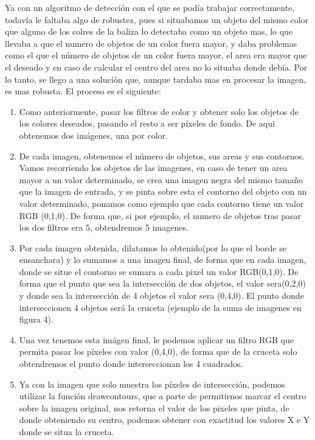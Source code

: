 \hspace{1cm} Ya con un algoritmo de detecci\'on con el que se pod\'ia trabajar correctamente, todav\'ia le faltaba algo de robustez, pues si situabamos un objeto del mismo color que alguno de los colres de la baliza lo detectaba como un objeto mas, lo que llevaba a que el numero de objetos de un color fuera mayor, y daba problemas como el que el n\'umero de objetos de un color fuera mayor, el area era mayor que el deseado y en caso de calcular el centro del area no lo situaba donde deb\'ia. Por lo tanto, se llego a una soluci\'on que, aunque tardaba mas en procesar la imagen, es mas robusta. El proceso es el siguiente:
\begin{enumerate}
	\item Como anteriormente, pasar los filtros de color y obtener solo los objetos de los colores deseados, pasando el resto a ser p\'ixeles de fondo. De aqui obtenemos dos im\'agenes, una por color.
	\item De cada imagen, obtenemos el n\'umero de objetos, sus areas y sus contornos. Vamos recorriendo los objetos de las imagenes,  en caso de tener un area mayor a un valor determinado, se crea una imagen negra del mismo tamaño que la imagen de entrada, y se pinta sobre esta el contorno del objeto con un valor determinado, ponamos como ejemplo que cada contorno tiene un valor RGB (0,1,0). De forma que, si por ejemplo, el numero de objetos tras pasar los dos filtros era 5, obtendremos 5 imagenes. 
	\item Por cada imagen obtenida, dilatamos lo obtenido(por lo que el borde se ensanchara) y lo sumamos a una imagen final, de forma que en cada imagen, donde se situe el contorno se sumara a cada pixel un valor RGB(0,1,0). De forma que el punto que sea la intersecci\'on de dos objetos, el valor sera(0,2,0) y donde sea la intersecci\'on de 4 objetos el valor sera (0,4,0). El punto donde interseccionen 4 objetos ser\'a la cruceta (ejemplo de la suma de imagenes en figura 4).
	\item Una vez tenemos esta im\'agen final, le podemos aplicar un filtro RGB que permita pasar los p\'ixeles con valor (0,4,0), de forma que de la cruceta solo obtendremos el punto donde interseccionan los 4 cuadrados.
	\item Ya con la imagen que solo muestra los p\'ixeles de intersecci\'on, podemos utilizar la funci\'on drawcontours, que a parte de permitirnos marcar el centro sobre la imagen original, nos retorna el valor de los pixeles que pinta, de donde obteniendo su centro, podemos obtener con exactitud los valores X e Y donde se situa la cruceta.

\end{enumerate}
